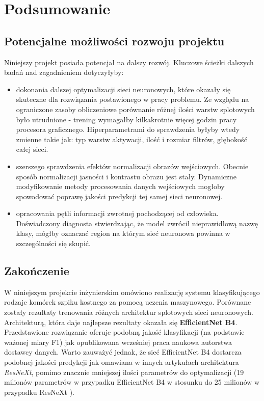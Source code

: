 \chapter{Podsumowanie}

\section{Potencjalne możliwości rozwoju projektu}

Niniejszy projekt posiada potencjał na dalszy rozwój. Kluczowe ścieżki dalszych badań nad zagadnieniem dotyczyłyby:
\begin{itemize}
\item dokonania dalszej optymalizacji sieci neuronowych, które okazały się skuteczne dla rozwiązania postawionego w pracy problemu. Ze względu na ograniczone zasoby obliczeniowe porównanie różnej ilości warstw splotowych było utrudnione - trening wymagałby kilkakrotnie więcej godzin pracy procesora graficznego. Hiperparametrami do sprawdzenia byłyby wtedy zmienne takie jak: typ warstw aktywacji, ilość i rozmiar filtrów, głębokość całej sieci.
\item szerszego sprawdzenia efektów normalizacji obrazów wejściowych. Obecnie sposób normalizacji jasności i kontrastu obrazu jest stały. Dynamiczne modyfikowanie metody procesowania danych wejściowych mogłoby spowodować poprawę jakości predykcji tej samej sieci neuronowej.
\item opracowania pętli informacji zwrotnej pochodzącej od człowieka. Doświadczony diagnosta stwierdzając, że model zwrócił nieprawidłową nazwę klasy, mógłby oznaczać region na którym sieć neuronowa powinna w szczególności się skupić.
\end{itemize}

\section{Zakończenie}

W niniejszym projekcie inżynierskim omówiono realizację systemu klasyfikującego rodzaje komórek szpiku kostnego za pomocą uczenia maszynowego.
Porównane zostały rezultaty trenowania różnych architektur splotowych sieci neuronowych.
Architekturą, która daje najlepsze rezultaty okazała się \textbf{EfficientNet B4}.
Przedstawione rozwiązanie oferuje podobną jakość klasyfikacji (na podstawie ważonej miary F1) jak opublikowana wcześniej praca naukowa autorstwa dostawcy danych.
Warto zauważyć jednak, że sieć EfficientNet B4 dostarcza podobnej jakości predykcji jak omawiana w innych artykułach architektura \textit{ResNeXt}, pomimo znacznie mniejszej ilości parametrów do optymalizacji (19 milionów parametrów w przypadku EfficientNet B4 w stosunku do 25 milionów w przypadku ResNeXt \cite{resnext}).

